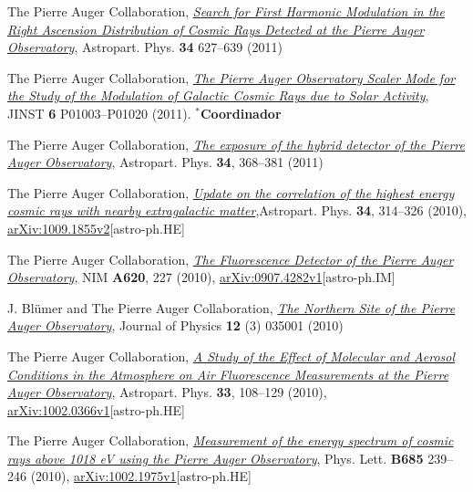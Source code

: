 \documentclass[11pt, a4paper]{article}
\newcommand{\years}[1]{\marginnote{\scriptsize #1}}
\begin{document}
\years{2011}The Pierre Auger Collaboration,
\href{http://dx.doi.org/10.1016/j.astropartphys.2010.12.007}{\emph{Search for
First Harmonic Modulation in the Right Ascension Distribution of Cosmic Rays
Detected at the Pierre Auger Observatory}}, Astropart. Phys. {\bf 34} 627--639
(2011)

\years{2011}The Pierre Auger Collaboration,
\href{http://dx.doi.org/10.1088/1748-0221/6/01/P01003}{\emph{The Pierre Auger
Observatory Scaler Mode for the Study of the Modulation of Galactic Cosmic Rays
due to Solar Activity}}, JINST {\bf 6} P01003--P01020 (2011).
$^*${\bf{Coordinador}}

\years{2010}The Pierre Auger Collaboration,
\href{http://dx.doi.org/10.1016/j.astropartphys.2010.10.001}{\emph{The exposure
of the hybrid detector of the Pierre Auger Observatory}}, Astropart. Phys. {\bf
34}, 368--381 (2011)

\years{2010}The Pierre Auger Collaboration,
\href{http://dx.doi.org/10.1016/j.astropartphys.2010.08.010}{\emph{Update on
the correlation of the highest energy cosmic rays with nearby extragalactic
matter}},Astropart. Phys. {\bf 34}, 314--326 (2010),
\href{http://arxiv.org/abs/1009.1855}{arXiv:1009.1855v2}[astro-ph.HE]

\years{2010}The Pierre Auger Collaboration,
\href{http://dx.doi.org/10.1016/j.nima.2010.04.023}{\emph{The Fluorescence
Detector of the Pierre Auger Observatory}}, NIM {\bf A620}, 227 (2010),
\href{http://arxiv.org/abs/0907.4282}{arXiv:0907.4282v1}[astro-ph.IM]

\years{2010}J. Bl\"umer and The Pierre Auger Collaboration,
\href{http://dx.doi.org/10.1088/1367-2630/12/3/035001}{\emph{The Northern Site
of the Pierre Auger Observatory}}, Journal of Physics {\bf 12} (3) 035001
(2010)

\years{2010}The Pierre Auger Collaboration,
\href{http://dx.doi.org/10.1016/j.astropartphys.2009.12.005}{\emph{A Study of
the Effect of Molecular and Aerosol Conditions in the Atmosphere on Air
Fluorescence Measurements at the Pierre Auger Observatory}}, Astropart. Phys.
{\bf 33}, 108--129 (2010),
\href{http://arxiv.org/abs/0907.4282}{arXiv:1002.0366v1}[astro-ph.HE]

\years{2010}The Pierre Auger Collaboration,
\href{http://dx.doi.org/10.1016/j.physletb.2010.02.013}{\emph{Measurement of
the energy spectrum of cosmic rays above 1018 eV using the Pierre Auger
Observatory}}, Phys. Lett. {\bf B685} 239--246 (2010),
\href{http://arxiv.org/abs/1002.1975}{arXiv:1002.1975v1}[astro-ph.HE]
\end{document}
